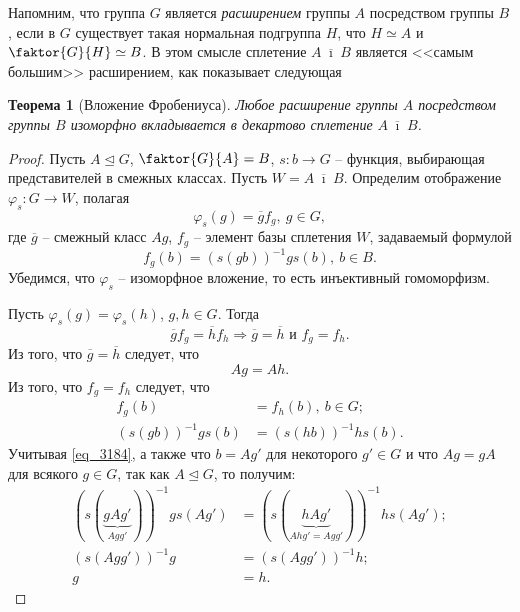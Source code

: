 \documentclass{article}
\newtheorem{theorem}{Теорема}[section]
\begin{document}
Напомним, что группа $G$ является \textit{расширением} группы $A$ посредством группы $B$, если в $G$ существует такая нормальная подгруппа $H$, что $H \simeq A$ и $\faktor{G}{H} \simeq B$.
В этом смысле сплетение $A \ \overline{\imath} \ B$ является <<самым большим>> расширением, как показывает следующая

\begin{theorem}[Вложение Фробениуса]
    Любое расширение группы $A$ посредством группы $B$ изоморфно вкладывается в декартово сплетение $A \ \overline{\imath} \ B$.
\end{theorem}
\begin{proof}
    Пусть $A \trianglelefteq G$, $\faktor{G}{A} = B$, $s: b \rightarrow G$ -- функция, выбирающая представителей в смежных классах. Пусть $W = A \ \overline{\imath} \ B $. Определим отображение $\varphi_s: G \rightarrow W$, полагая $$ \varphi_s(g) = \overline{g} f_g, \ g \in G, $$ где $\overline{g}$ -- смежный класс $Ag$, $f_g$ -- элемент базы сплетения $W$, задаваемый формулой
    \[
        f_g(b) = (s(gb))^{-1} g s(b), \ b \in B.
    \]
    Убедимся, что $\varphi_s$ -- изоморфное вложение, то есть инъективный гомоморфизм.

    Пусть $\varphi_s(g) = \varphi_s(h)$, $g, h \in G$. Тогда
    \[
        \overline{g} f_g = \overline{h} f_h \Rightarrow \overline{g} = \overline{h} \text{ и } f_g = f_h.
    \]
    Из того, что $\overline{g} = \overline{h}$ следует, что
    \begin{equation} \label{eq_3184}
        Ag = Ah.
    \end{equation}
    Из того, что $f_g = f_h$ следует, что
    \begin{align*}
        f_g(b) &= f_h(b), \ b \in G; \\
        (s(gb))^{-1} g s(b) &= (s(hb))^{-1} h s(b).
    \end{align*}
    Учитывая \eqref{eq_3184}, а также что $b = Ag'$ для некоторого $g' \in G$ и что $Ag = gA$ для всякого $g \in G$, так как $A \trianglelefteq G$, то получим:
    \begin{align*}
        (s(\underbrace{gAg'}_{Agg'}))^{-1} g s(Ag') &= (s(\underbrace{hAg'}_{Ahg' = Agg'}))^{-1} h s(Ag'); \\
        (s(Agg'))^{-1} g &= (s(Agg'))^{-1} h; \\
        g &= h.
    \end{align*}


\end{proof}
\end{document}
